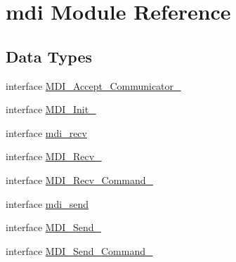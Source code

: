 \hypertarget{classmdi}{\section{mdi Module Reference}
\label{classmdi}
}
\subsection*{Data Types}
\begin{DoxyCompactItemize}
\item 
interface \hyperlink{interfacemdi_1_1MDI__Accept__Communicator__}{M\-D\-I\-\_\-\-Accept\-\_\-\-Communicator\-\_\-}
\item 
interface \hyperlink{interfacemdi_1_1MDI__Init__}{M\-D\-I\-\_\-\-Init\-\_\-}
\item 
interface \hyperlink{interfacemdi_1_1mdi__recv}{mdi\-\_\-recv}
\item 
interface \hyperlink{interfacemdi_1_1MDI__Recv__}{M\-D\-I\-\_\-\-Recv\-\_\-}
\item 
interface \hyperlink{interfacemdi_1_1MDI__Recv__Command__}{M\-D\-I\-\_\-\-Recv\-\_\-\-Command\-\_\-}
\item 
interface \hyperlink{interfacemdi_1_1mdi__send}{mdi\-\_\-send}
\item 
interface \hyperlink{interfacemdi_1_1MDI__Send__}{M\-D\-I\-\_\-\-Send\-\_\-}
\item 
interface \hyperlink{interfacemdi_1_1MDI__Send__Command__}{M\-D\-I\-\_\-\-Send\-\_\-\-Command\-\_\-}
\end{DoxyCompactItemize}
